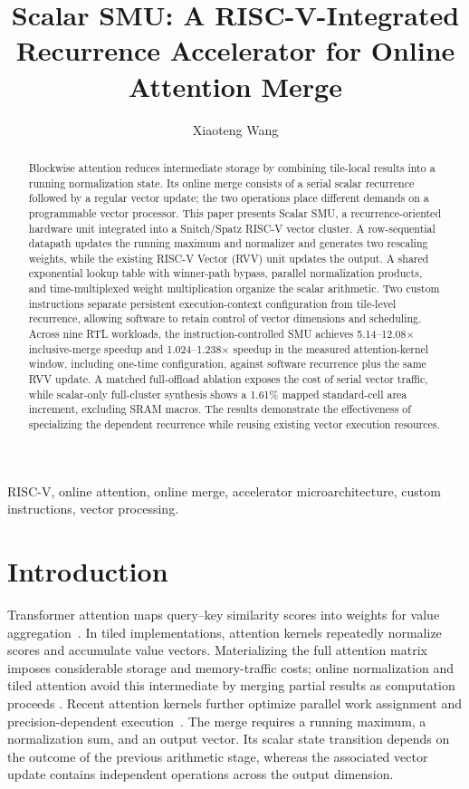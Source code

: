 \documentclass[journal]{IEEEtran}
\title{Scalar SMU: A RISC-V-Integrated Recurrence Accelerator for Online Attention Merge}
\author{Xiaoteng Wang}
\begin{document}
\maketitle
\begin{abstract}
Blockwise attention reduces intermediate storage by combining tile-local
results into a running normalization state. Its online merge consists of a
serial scalar recurrence followed by a regular vector update; the two
operations place different demands on a programmable vector processor. This
paper presents Scalar SMU, a recurrence-oriented hardware unit integrated
into a Snitch/Spatz RISC-V vector cluster. A row-sequential datapath updates
the running maximum and normalizer and generates two rescaling weights,
while the existing RISC-V Vector (RVV) unit updates the output. A shared
exponential lookup table with winner-path bypass, parallel normalization
products, and time-multiplexed weight multiplication organize the scalar
arithmetic. Two custom instructions separate persistent execution-context
configuration from tile-level recurrence, allowing software to retain
control of vector dimensions and scheduling. Across nine RTL workloads, the
instruction-controlled SMU achieves 5.14--12.08$\times$ inclusive-merge
speedup and 1.024--1.238$\times$ speedup in the measured attention-kernel
window, including one-time configuration, against software recurrence plus
the same RVV update. A matched full-offload ablation exposes the cost of
serial vector traffic, while scalar-only full-cluster synthesis shows a
1.61\% mapped standard-cell area increment, excluding SRAM macros. The
results demonstrate the effectiveness of specializing the dependent
recurrence while reusing existing vector execution resources.
\end{abstract}
\begin{IEEEkeywords}
RISC-V, online attention, online merge, accelerator microarchitecture,
custom instructions, vector processing.
\end{IEEEkeywords}

\section{Introduction}
Transformer attention maps query--key similarity scores into weights for
value aggregation~\cite{vaswani2017attention}. In tiled implementations,
attention kernels repeatedly normalize scores and accumulate value vectors.
Materializing the full attention matrix imposes considerable storage and
memory-traffic costs; online normalization and tiled attention avoid this
intermediate by merging partial results as computation proceeds
\cite{milakov2018online,dao2022flashattention,dao2024flashattention}.
Recent attention kernels further optimize parallel work assignment and
precision-dependent execution~\cite{shah2024flashattention3}. The merge
requires a running maximum, a normalization sum, and an output vector. Its
scalar state transition depends on the outcome of the previous arithmetic
stage, whereas the associated vector update contains independent operations
across the output dimension.
\end{document}
